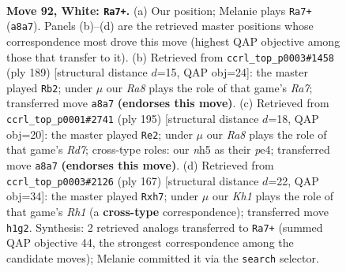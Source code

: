 \documentclass[11pt]{article}
\begin{document}
\clearpage

\begin{figure}[p]\centering
\begin{subfigure}{0.46\textwidth}\centering
\resizebox{\linewidth}{!}{%
\newchessgame
\chessboard[
  setfen={R7/7k/8/7n/p6r/P7/7p/7K w - - 10 92},
  showmover=false,
  pgfstyle=straightmove, color=movearrow, markmove={a8-a7}
]}
\caption{}
\end{subfigure}\hfill
\begin{subfigure}{0.46\textwidth}\centering
\resizebox{\linewidth}{!}{%
\newchessgame
\chessboard[
  setfen={8/8/4K3/pPk5/P5R1/8/r7/8 b - - 88 95},
  showmover=false,
  pgfstyle=straightmove, color=movearrow, markmove={a2-b2}
]}
\caption{}
\end{subfigure}
\\[4pt]
\begin{subfigure}{0.46\textwidth}\centering
\resizebox{\linewidth}{!}{%
\newchessgame
\chessboard[
  setfen={8/6k1/4R1P1/2K5/4P3/8/3r4/8 b - - 72 98},
  showmover=false,
  pgfstyle=straightmove, color=movearrow, markmove={d2-e2}
]}
\caption{}
\end{subfigure}\hfill
\begin{subfigure}{0.46\textwidth}\centering
\resizebox{\linewidth}{!}{%
\newchessgame
\chessboard[
  setfen={7r/1R5P/6k1/6p1/6P1/8/6K1/8 b - - 2 84},
  showmover=false,
  pgfstyle=straightmove, color=movearrow, markmove={h8-h7}
]}
\caption{}
\end{subfigure}
\caption{\textbf{Move 92, White: \texttt{Ra7+}.} (a) Our position; Melanie plays \texttt{Ra7+} (\texttt{a8a7}). Panels (b)--(d) are the retrieved master positions whose correspondence most drove this move (highest QAP objective among those that transfer to it). (b) Retrieved from \texttt{ccrl\_top\_p0003\#1458} (ply 189) [structural distance $d$=15, QAP obj=24]: the master played \texttt{Rb2}; under $\mu$ our \emph{Ra8} plays the role of that game's \emph{Ra7}; transferred move \texttt{a8a7} \textbf{(endorses this move)}. (c) Retrieved from \texttt{ccrl\_top\_p0001\#2741} (ply 195) [structural distance $d$=18, QAP obj=20]: the master played \texttt{Re2}; under $\mu$ our \emph{Ra8} plays the role of that game's \emph{Rd7}; cross-type roles: our \emph{n}h5 as their \emph{p}e4; transferred move \texttt{a8a7} \textbf{(endorses this move)}. (d) Retrieved from \texttt{ccrl\_top\_p0003\#2126} (ply 167) [structural distance $d$=22, QAP obj=34]: the master played \texttt{Rxh7}; under $\mu$ our \emph{Kh1} plays the role of that game's \emph{Rh1} (a \textbf{cross-type} correspondence); transferred move \texttt{h1g2}. Synthesis: 2 retrieved analogs transferred to \texttt{Ra7+} (summed QAP objective 44, the strongest correspondence among the candidate moves); Melanie committed it via the \texttt{search} selector.}
\label{fig:thought-m182}
\end{figure}
\end{document}

